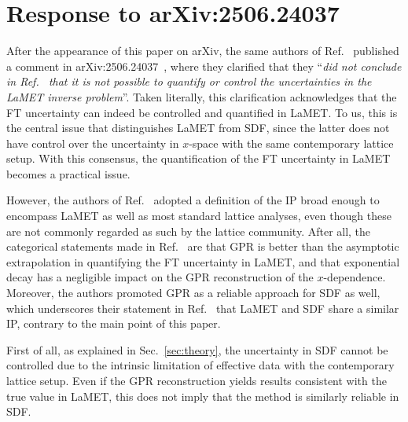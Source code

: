 \documentclass[prd,twocolumn,superscriptaddress,preprintnumbers,showpacs,nofootinbib,notitlepage,floatfix]{revtex4-2}
\DeclareRobustCommand{\sec}[1]{Sec.~\ref{sec:#1}}
\begin{document}
\appendix

\section{Response to arXiv:2506.24037}
\label{app:reply}

After the appearance of this paper on arXiv, the same authors of Ref.~\cite{Dutrieux:2025jed} published a comment in arXiv:2506.24037~\cite{Dutrieux:2025axb}, where they clarified that they ``\textit{did not conclude in Ref.~\cite{Dutrieux:2025jed} that it is not possible to quantify or control the uncertainties in the LaMET inverse problem}''. Taken literally, this clarification acknowledges that the FT uncertainty can indeed be controlled and quantified in LaMET. To us, this is the central issue that distinguishes LaMET from SDF, since the latter does not have control over the uncertainty in $x$-space with the same contemporary lattice setup. With this consensus, the quantification of the FT uncertainty in LaMET becomes a practical issue.

However, the authors of Ref.~\cite{Dutrieux:2025jed} adopted a definition of the IP broad enough to encompass LaMET as well as most standard lattice analyses, even though these are not commonly regarded as such by the lattice community. After all, the categorical statements made in Ref.~\cite{Dutrieux:2025axb} are that GPR is better than the asymptotic extrapolation in quantifying the FT uncertainty in LaMET, and that exponential decay has a negligible impact on the GPR reconstruction of the $x$-dependence. Moreover, the authors promoted GPR as a reliable approach for SDF as well, which underscores their statement in Ref.~\cite{Dutrieux:2025jed} that LaMET and SDF share a similar IP, contrary to the main point of this paper.

First of all, as explained in \sec{theory}, the uncertainty in SDF cannot be controlled due to the intrinsic limitation of effective data with the contemporary lattice setup. Even if the GPR reconstruction yields results consistent with the true value in LaMET, this does not imply that the method is similarly reliable in SDF.
\end{document}
